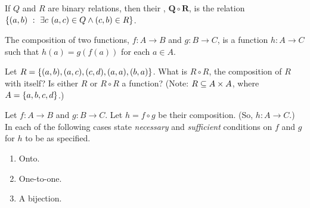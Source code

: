 \begin{defn}
If $Q$ and $R$ are binary relations, then their , $\bm{Q \circ R}$, is the relation $\setbuild{(a, b)}{\exists c\ (a, c) \in Q \land (c, b) \in R}$.

The composition of two functions, $f : A \to B$ and $g : B \to C$, is a function $h : A \to C$ such that $h(a) = g(f(a))$ for each $a \in A$.
\end{defn}

\begin{exer1}
Let $R = \left\lbrace (a, b), (a, c), (c, d), (a, a), (b, a) \right\rbrace$. What is $R \circ R$, the composition of $R$ with itself? Is either $R$ or $R \circ R$ a function?  (Note: $R \subseteq A \times A$, where $A = \left\lbrace a, b, c, d \right\rbrace$.)
\end{exer1}

\begin{exer2}
Let $f : A \to B$ and $g : B \to C$. Let $h = f \circ g$ be their composition. (So, $h : A \to C$.) In each of the following cases state \emph{necessary} and \emph{sufficient} conditions on $f$ and $g$ for $h$ to be as specified.
\begin{enumerate}[label=(\alph*)]
\item Onto.
\item One-to-one.
\item A bijection.
\end{enumerate}
\end{exer2}

